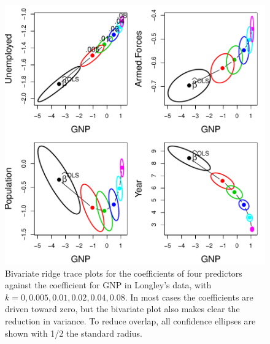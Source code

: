 \begin{figure}[htb!]
  \centering
  \includegraphics[width=\textwidth,clip]{fig/ridge2}
  \caption{Bivariate ridge trace plots for the coefficients of four predictors
  	against the coefficient for GNP in Longley's data, with
  	$k = 0, 0.005, 0.01, 0.02, 0.04, 0.08$.
  	In most cases the coefficients are driven toward zero, but the bivariate
  	plot also makes clear the reduction in variance.
  	To reduce overlap, all confidence ellipses are shown with 1/2 the standard radius.}%
  \label{fig:ridge2}
\end{figure}

